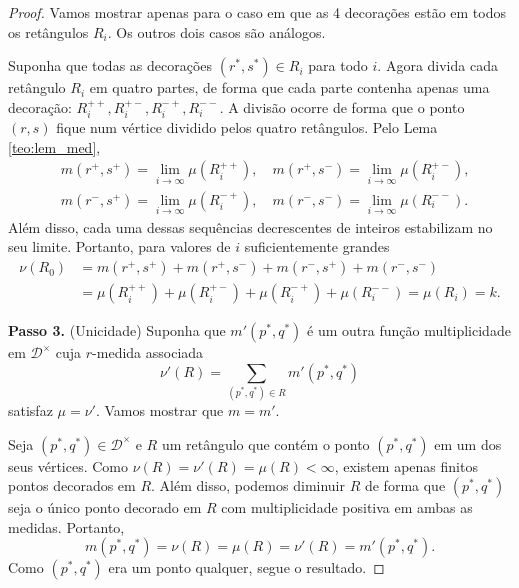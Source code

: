 \begin{proof}
Vamos mostrar apenas para o caso em que as 4 decorações estão em todos os retângulos $R_i$. Os outros
dois casos são análogos. 

Suponha que todas as decorações $(r^*, s^*) \in R_i$ para todo $i$. Agora divida cada retângulo
$R_i$ em quatro partes, de forma que cada parte contenha apenas uma decoração: $R_i^{++}, R_i^{+-},
R_i^{-+}, R_i^{--}$. A divisão ocorre de forma que o ponto $(r,s)$ fique num vértice dividido pelos 
quatro retângulos. Pelo Lema \ref{teo:lem_med},
\begin{align*} 
    & m(r^+, s^+) = \lim_{i \to \infty} \mu(R_i^{++}), \quad m(r^+, s^-) = \lim_{i \to \infty} \mu(R_i^{+-}), \\
    & m(r^-, s^+) = \lim_{i \to \infty} \mu(R_i^{-+}), \quad m(r^-, s^-) = \lim_{i \to \infty} \mu(R_i^{--}).
\end{align*}
Além disso, cada uma dessas sequências decrescentes de inteiros estabilizam no seu limite. Portanto, para valores
de $i$ suficientemente grandes
\begin{align*}
    \nu(R_0) & = m(r^+, s^+) + m(r^+, s^-) + m(r^-, s^+) + m(r^-, s^-) \\
             & = \mu(R_i^{++}) +  \mu(R_i^{+-}) + \mu(R_i^{-+}) + \mu(R_i^{--}) = \mu(R_i) = k. 
\end{align*}

\textbf{Passo 3.} (Unicidade) Suponha que $m'(p^*, q^*)$ é um outra função multiplicidade em $\mathcal{D}^\times$ 
cuja $r$-medida associada 
\begin{equation*}
    \nu'(R) = \sum_{(p^*, q^*) \in R} m'(p^*, q^*)
\end{equation*}
satisfaz $\mu = \nu'$. Vamos mostrar que $m=m'$. 

Seja $(p^*, q^*) \in \mathcal{D}^\times$ e $R$ um retângulo que contém o ponto $(p^*, q^*)$ em um
dos seus vértices. Como $\nu(R) = \nu'(R) = \mu(R) < \infty$, existem apenas finitos pontos decorados
em $R$. Além disso, podemos diminuir $R$ de forma que $(p^*, q^*)$ seja o único ponto decorado em $R$
com multiplicidade positiva em ambas as medidas. Portanto,
\begin{equation*}
    m(p^*, q^*) = \nu(R) = \mu(R) = \nu'(R) = m'(p^*, q^*).
\end{equation*} 
Como $(p^*, q^*)$ era um ponto qualquer, segue o resultado. 
\end{proof}

